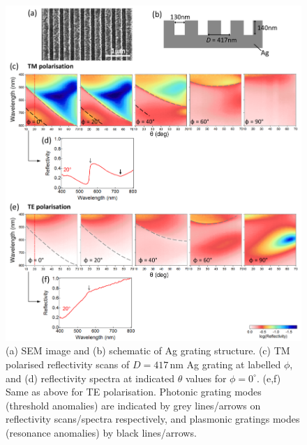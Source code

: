 \begin{figure}[ht] 
\centering    
\includegraphics[width=\textwidth]{Fig8}
\caption{(a) SEM image and (b) schematic of Ag grating structure. (c) TM polarised reflectivity scans of $D=417$\,nm Ag grating at labelled $\phi$, and (d) reflectivity spectra at indicated $\theta$ values for $\phi=0^{\circ}$. (e,f) Same as above for TE polarisation. Photonic grating modes (threshold anomalies) are indicated by grey lines/arrows on reflectivity scans/spectra respectively, and plasmonic gratings modes (resonance anomalies) by black lines/arrows.}
\label{7Fig8}
\end{figure}

